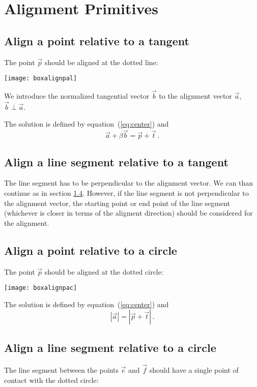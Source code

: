 \documentclass{article}
\begin{document}
\pagebreak
\section{Alignment Primitives}
\subsection{Align a point relative to a tangent}
The point $\vec p$ should be aligned at the dotted line:

\centerline{\texttt{[image: boxalignpal]}}

We introduce the normalized tangential vector $\vec b$ to the
alignment vector $\vec a$, $\vec b\perp\vec a$.

The solution is defined by equation~(\ref{eq:center}) and
\begin{equation}
\vec a+\beta\vec b=\vec p+\vec t\,.
\end{equation}

\subsection{Align a line segment relative to a tangent}
The line segment has to be perpendicular to the alignment vector.
We can than continue as in section \ref{s:calignline}. However, if the
line segment is not perpendicular to the alignment vector, the
starting point or end point of the line segment (whichever is closer
in terms of the aligment direction) should be considered for the
alignment.

\subsection{Align a point relative to a circle}
The point $\vec p$ should be aligned at the dotted circle:

\centerline{\texttt{[image: boxalignpac]}}

The solution is defined by equation~(\ref{eq:center}) and
\begin{equation}
|\vec a|=|\vec p+\vec t|\,.
\end{equation}

\subsection{Align a line segment relative to a circle}
\label{s:calignline}
The line segment between the points $\vec e$ and $\vec f$ should have
a single point of contact with the dotted circle:
\end{document}
